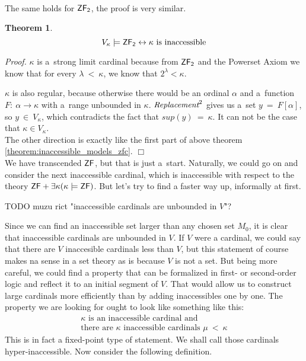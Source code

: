 \documentclass[12pt,a4paper]{article}
\newtheorem{theorem}{Theorem}[section]
\newenvironment{proof}
{\noindent \textit{Proof.}}
{\hspace*{\fill} $\Box$}
\renewcommand{\iff}{\leftrightarrow}
\newcommand{\then}{\rightarrow}
\begin{document}
\

The same holds for $\sf{ZF}_2$, the proof is very similar.
\begin{theorem}\label{theorem:inaccessible_models_zfc_2}
\begin{equation}
V_\kappa \models \sf{ZF}_2 \iff \mbox{$\kappa$ is inaccessible}
\end{equation}
\end{theorem}
\begin{proof}
$\kappa$ is a~strong limit cardinal because from $\sf{ZF}_2$ and the Powerset Axiom we know that for every $\lambda\ <\ \kappa$, we know that $2^{\lambda} < \kappa$.

$\kappa$ is also regular, because otherwise there would be an ordinal $\alpha$ and a~function $F:\ \alpha \then \kappa$ with a~range unbounded in $\kappa$. 
$\emph{Replacement}^2$ gives us a~set $y\ =\ F[\alpha]$, so $y\ \in\ V_\kappa$, which contradicts the fact that $sup(y)\ =\ \kappa$. It can not be the case that $\kappa \in V_\kappa$.
\\

The other direction is exactly like the first part of above theorem \ref{theorem:inaccessible_models_zfc}.
\end{proof}
\\



We have transcended $\sf{ZF}$, but that is just a~start. Naturally, we could go on and consider the next inaccessible cardinal, which is inaccessible with respect to the theory $\sf{ZF} + \exists \kappa (\kappa \models \sf{ZF})$. But let's try to find a faster way up, informally at first. 

TODO muzu rict "inaccessible cardinals are unbounded in $V$"?

Since we can find an inaccessible set larger than any chosen set $M_0$, it is clear that inaccessible cardinals are unbounded in $V$. If $V$ were a cardinal, we could say that there are $V$ inaccesible cardinals less than $V$, but this statement of course makes na sense in a set theory as is because $V$ is not a set. But being more careful, we could find a property that can be formalized in first- or second-order logic and reflect it to an initial segment of $V$. That would allow us to construct large cardinals more efficiently than by adding inaccessibles one by one. The property we are looking for ought to look like something like this:
\begin{equation}
\begin{split}
\kappa \mbox{ is an inaccessible cardinal and}\\
\mbox{there are }\kappa\mbox{ inaccessible cardinals }\mu\ <\ \kappa
\end{split}
\end{equation}
This is in fact a fixed-point type of statement. We shall call those cardinals hyper-inaccessible. Now consider the following definition.
\end{document}
